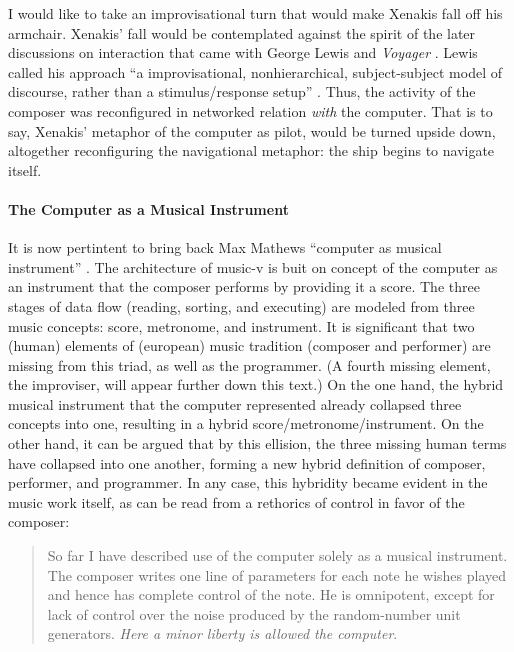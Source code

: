 I would like to take an improvisational turn that would make Xenakis fall off his armchair. Xenakis' fall would be contemplated against the spirit of the later discussions on interaction that came with George Lewis and \textit{Voyager} \parencite{Lew93:Put, Lew99:Int, Lew00:Too}. Lewis called his approach ``a improvisational, nonhierarchical, subject-subject model of discourse, rather than a stimulus/response setup'' \parencite[104]{Lew99:Int}. Thus, the activity of the composer was reconfigured in networked relation \textit{with} the computer. That is to say, Xenakis' metaphor of the computer as pilot, would be turned upside down, altogether reconfiguring the navigational metaphor: the ship begins to navigate itself.

\paragraph{The Computer as a Musical Instrument}
It is now pertintent to bring back Max Mathews ``computer as musical instrument'' \parencite{Mat63:The}. The architecture of \gls{music-v} is buit on concept of the computer as an instrument that the composer performs by providing it a score. The three stages of data flow (reading, sorting, and executing) are modeled from three music concepts: score, metronome, and instrument. It is significant that two (human) elements of (european) music tradition (composer and performer) are missing from this triad, as well as the programmer. (A fourth missing element, the improviser, will appear further down this text.) On the one hand, the hybrid musical instrument that the computer represented already collapsed three concepts into one, resulting in a hybrid score/metronome/instrument. On the other hand, it can be argued that by this ellision, the three missing human terms have collapsed into one another, forming a new hybrid definition of composer, performer, and programmer. In any case, this hybridity became evident in the music work itself, as can be read from a rethorics of control in favor of the composer: 

\begin{quote}
	So far I have described use of the computer solely as a musical instrument. The composer writes one line of parameters for each note he wishes played and hence has complete control of the note. He is omnipotent, except for lack of control over the noise produced by the random-number unit generators. \textit{Here a minor liberty is allowed the computer}. \im \parencite[557]{Mat63:The}
\end{quote}

